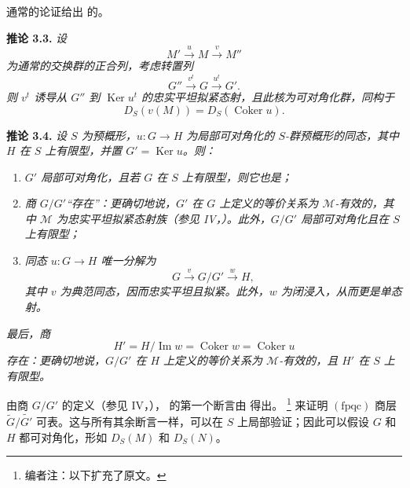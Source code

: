 通常的论证给出  的。

\medskip
\noindent{}\textbf{推论 3.3.}
\textit{设}
\[
  M'\xrightarrow{u}M\xrightarrow{v}M''
\]
\textit{为通常的交换群的正合列，考虑转置列}
\[
  G''\xrightarrow{v^t}G\xrightarrow{u^t}G'.
\]
\textit{则 \(v^t\) 诱导从 \(G''\) 到 \(\operatorname{Ker}u^t\) 的忠实平坦拟紧态射，且此核为可对角化群，同构于}
\[
  D_S(v(M))=D_S(\operatorname{Coker}u).
\]

\medskip
\noindent{}\textbf{推论 3.4.}
\textit{设 \(S\) 为预概形，\(u:G\to H\) 为局部可对角化的 \(S\)-群预概形的同态，其中 \(H\) 在 \(S\) 上有限型，并置 \(G'=\operatorname{Ker}u\)。则：}
\begin{enumerate}
  \item[(a)]
  \textit{\(G'\) 局部可对角化，且若 \(G\) 在 \(S\) 上有限型，则它也是；}

  \item[(b)]
  \textit{商 \(G/G'\)“存在”：更确切地说，\(G'\) 在 \(G\) 上定义的等价关系为 \(\mathcal M\)-有效的，其中 \(\mathcal M\) 为忠实平坦拟紧态射族（参见 IV，）。此外，\(G/G'\) 局部可对角化且在 \(S\) 上有限型；}

  \item[(c)]
  \textit{同态 \(u:G\to H\) 唯一分解为}
  \[
    G\xrightarrow{v}G/G'\xrightarrow{w}H,
  \]
  \textit{其中 \(v\) 为典范同态，因而忠实平坦且拟紧。此外，\(w\) 为闭浸入，从而更是单态射。}
\end{enumerate}
\textit{最后，商}
\[
  H'=H/\operatorname{Im}w
    =\operatorname{Coker}w
    =\operatorname{Coker}u
\]
\textit{存在：更确切地说，\(G/G'\) 在 \(H\) 上定义的等价关系为 \(\mathcal M\)-有效的，且 \(H'\) 在 \(S\) 上有限型。}

由商 \(G/G'\) 的定义（参见 IV，）， 的第一个断言由  得出。
\footnote{编者注：以下扩充了原文。}
来证明 \((\mathrm{fpqc})\) 商层 \(\widetilde G/\widetilde{G'}\) 可表。这与所有其余断言一样，可以在 \(S\) 上局部验证；因此可以假设 \(G\) 和 \(H\) 都可对角化，形如 \(D_S(M)\) 和 \(D_S(N)\)。

